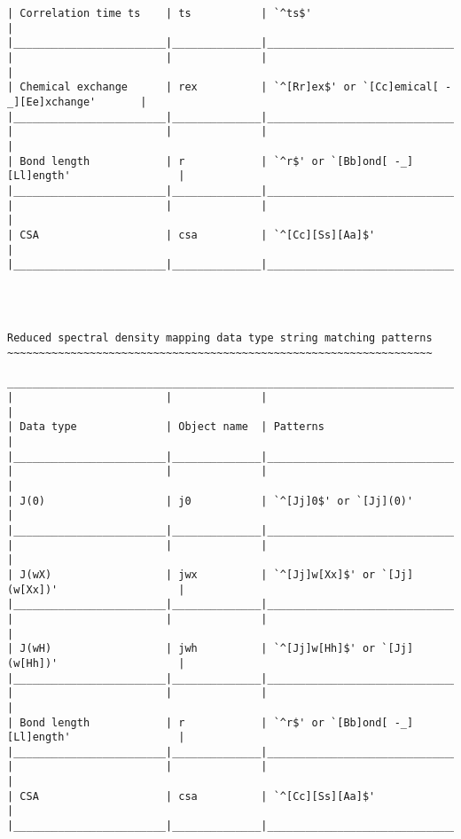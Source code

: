 {\begin{verbatim}
| Correlation time ts    | ts           | `^ts$'                                           |
|________________________|______________|__________________________________________________|
|                        |              |                                                  |
| Chemical exchange      | rex          | `^[Rr]ex$' or `[Cc]emical[ -_][Ee]xchange'       |
|________________________|______________|__________________________________________________|
|                        |              |                                                  |
| Bond length            | r            | `^r$' or `[Bb]ond[ -_][Ll]ength'                 |
|________________________|______________|__________________________________________________|
|                        |              |                                                  |
| CSA                    | csa          | `^[Cc][Ss][Aa]$'                                 |
|________________________|______________|__________________________________________________|




Reduced spectral density mapping data type string matching patterns
~~~~~~~~~~~~~~~~~~~~~~~~~~~~~~~~~~~~~~~~~~~~~~~~~~~~~~~~~~~~~~~~~~~

____________________________________________________________________________________________
|                        |              |                                                  |
| Data type              | Object name  | Patterns                                         |
|________________________|______________|__________________________________________________|
|                        |              |                                                  |
| J(0)                   | j0           | `^[Jj]0$' or `[Jj](0)'                           |
|________________________|______________|__________________________________________________|
|                        |              |                                                  |
| J(wX)                  | jwx          | `^[Jj]w[Xx]$' or `[Jj](w[Xx])'                   |
|________________________|______________|__________________________________________________|
|                        |              |                                                  |
| J(wH)                  | jwh          | `^[Jj]w[Hh]$' or `[Jj](w[Hh])'                   |
|________________________|______________|__________________________________________________|
|                        |              |                                                  |
| Bond length            | r            | `^r$' or `[Bb]ond[ -_][Ll]ength'                 |
|________________________|______________|__________________________________________________|
|                        |              |                                                  |
| CSA                    | csa          | `^[Cc][Ss][Aa]$'                                 |
|________________________|______________|__________________________________________________|
\end{verbatim}
}



